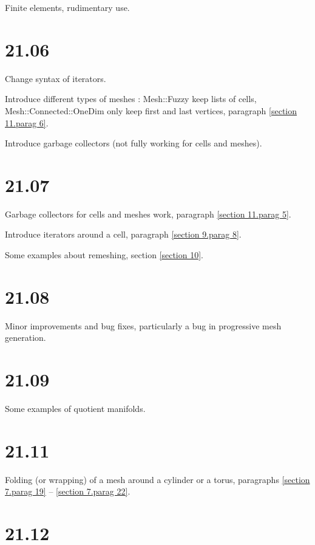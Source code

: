\documentclass[a4paper,oneside]{scrbook}
\def\numb{}
\newcommand\verm[1]{\textcolor{manif}{#1}}
\renewcommand\tt{\normalfont\ttfamily}
\begin{document}
\noindent Finite elements, rudimentary use.


\section*{21.06}

\noindent Change syntax of iterators.

\noindent Introduce different types of meshes :
{\small\tt\verm{Mesh}::Fuzzy} keep lists of cells,
{\small\tt\verm{Mesh}::Connected::OneDim} only keep first and last vertices,
paragraph \ref{\numb section 11.\numb parag 6}.

\noindent Introduce garbage collectors (not fully working for cells and meshes).


\section*{21.07}

\noindent Garbage collectors for cells and meshes work,
paragraph \ref{\numb section 11.\numb parag 5}.

\noindent Introduce iterators around a cell, paragraph \ref{\numb section 9.\numb parag 8}.

\noindent Some examples about remeshing, section \ref{\numb section 10}.


\section*{21.08}

\noindent Minor improvements and bug fixes, particularly a bug in progressive mesh generation.


\section*{21.09}

\noindent Some examples of quotient manifolds.


\section*{21.11}

\noindent Folding (or wrapping) of a mesh around a cylinder or a torus, paragraphs
\ref{\numb section 7.\numb parag 19} -- \ref{\numb section 7.\numb parag 22}.


\section*{21.12}
\end{document}
